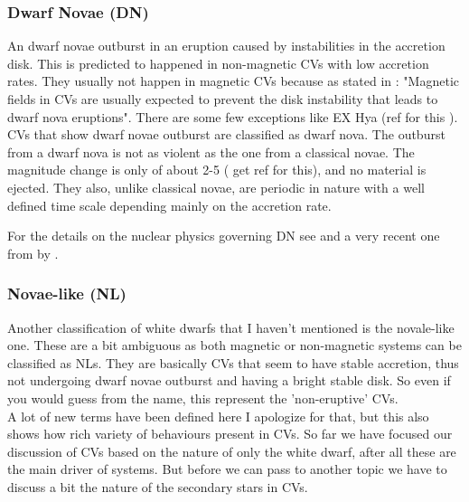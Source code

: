 \subsubsection{Dwarf Novae (DN)}

An dwarf novae outburst in an eruption caused by instabilities in the accretion disk. This is predicted to happened in non-magnetic CVs with low accretion rates. They usually not happen in magnetic CVs because as stated in \cite{shara_erupting_2005}: "Magnetic fields in CVs are usually expected to prevent the disk instability that leads to dwarf nova eruptions". There are some few exceptions like EX Hya (ref for this \cite{a}). CVs that show dwarf novae outburst are classified as dwarf nova. The outburst from a dwarf nova is not as violent as the one from a classical novae. The magnitude change is only of about 2-5 (\cite{ref} get ref for this), and no material is ejected. They also, unlike classical novae, are periodic in nature with a well defined time scale depending mainly on the accretion rate.  

For the details on the nuclear physics governing DN see\cite{shara_recent_1989} and a very recent one from \citeyear{starrfield_thermonuclear_2016} by \citeauthor{starrfield_thermonuclear_2016}. \\



\subsubsection{Novae-like (NL)}

Another classification of white dwarfs that I haven't mentioned is the novale-like one. These are a bit ambiguous as both magnetic or non-magnetic systems can be classified as NLs. They are basically CVs that seem to have stable accretion, thus not undergoing dwarf novae outburst and having a bright stable disk. So even if you would guess from the name, this represent the 'non-eruptive' CVs. \\

A lot of new terms have been defined here I apologize for that, but this also shows how rich variety of behaviours present in CVs. So far we have focused our discussion of CVs based on the nature of only the white dwarf, after all these are the main driver of systems. But before we can pass to another topic we have to discuss a bit the nature of the secondary stars in CVs. 


